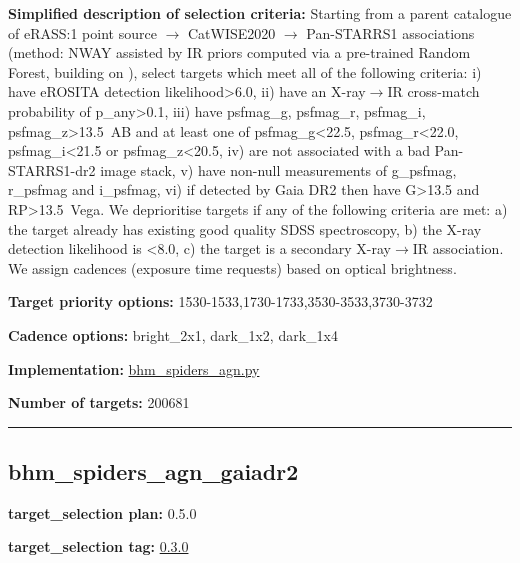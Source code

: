 \noindent\textbf{Simplified description of selection criteria:} Starting from a
parent catalogue of eRASS:1 point source $\rightarrow$ CatWISE2020 $\rightarrow$ Pan-STARRS1
associations (method: NWAY assisted by IR priors computed via a
pre-trained Random Forest, building on
\citealt{Salvato2022}), select targets which meet all of the following criteria:
i) have eROSITA detection likelihood\textgreater6.0, ii) have an
X-ray$\rightarrow$IR cross-match probability of p\_any\textgreater0.1, iii) have
psfmag\_g, psfmag\_r, psfmag\_i, psfmag\_z\textgreater13.5~AB and at
least one of psfmag\_g\textless22.5, psfmag\_r\textless22.0,
psfmag\_i\textless21.5 or psfmag\_z\textless20.5, iv) are not associated
with a bad Pan-STARRS1-dr2 image stack, v) have non-null measurements of
g\_psfmag, r\_psfmag and i\_psfmag, vi) if detected by Gaia DR2 then
have G\textgreater13.5 and RP\textgreater13.5~Vega. We deprioritise
targets if any of the following criteria are met: a) the target already
has existing good quality SDSS spectroscopy, b) the X-ray detection
likelihood is \textless8.0, c) the target is a secondary X-ray$\rightarrow$IR
association. We assign cadences (exposure time requests) based on
optical brightness.


\noindent\textbf{Target priority options:}
1530-1533,1730-1733,3530-3533,3730-3732

\noindent\textbf{Cadence options:} bright\_2x1, dark\_1x2, dark\_1x4

\noindent\textbf{Implementation:}
\href{https://github.com/sdss/target_selection/blob/0.3.0/python/target_selection/cartons/bhm_spiders_agn.py}{bhm\_spiders\_agn.py}

\noindent\textbf{Number of targets:} 200681

\begin{center}\rule{0.5\linewidth}{0.5pt}\end{center}

\hypertarget{bhm_spiders_agn_gaiadr2_plan0.5.0}{%
\subsection{bhm\_spiders\_agn\_gaiadr2}\label{bhm_spiders_agn_gaiadr2_plan0.5.0}}

\noindent\textbf{target\_selection plan:} 0.5.0

\noindent\textbf{target\_selection tag:}
\href{https://github.com/sdss/target_selection/tree/0.3.0/}{0.3.0}

